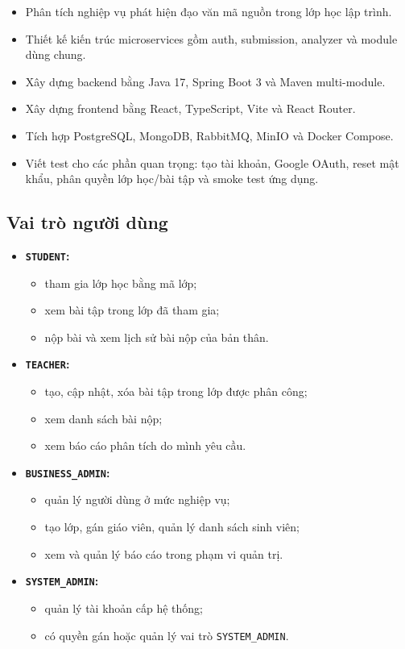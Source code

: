 \documentclass[12pt,a4paper]{article}
\begin{document}
\begin{itemize}
    \item Phân tích nghiệp vụ phát hiện đạo văn mã nguồn trong lớp học lập trình.
    \item Thiết kế kiến trúc microservices gồm auth, submission, analyzer và module dùng chung.
    \item Xây dựng backend bằng Java 17, Spring Boot 3 và Maven multi-module.
    \item Xây dựng frontend bằng React, TypeScript, Vite và React Router.
    \item Tích hợp PostgreSQL, MongoDB, RabbitMQ, MinIO và Docker Compose.
    \item Viết test cho các phần quan trọng: tạo tài khoản, Google OAuth, reset mật khẩu, phân quyền lớp học/bài tập và smoke test ứng dụng.
\end{itemize}

\subsection{Vai trò người dùng}

\begin{itemize}
    \item \textbf{\texttt{STUDENT}:}
    \begin{itemize}
        \item tham gia lớp học bằng mã lớp;
        \item xem bài tập trong lớp đã tham gia;
        \item nộp bài và xem lịch sử bài nộp của bản thân.
    \end{itemize}
    \item \textbf{\texttt{TEACHER}:}
    \begin{itemize}
        \item tạo, cập nhật, xóa bài tập trong lớp được phân công;
        \item xem danh sách bài nộp;
        \item xem báo cáo phân tích do mình yêu cầu.
    \end{itemize}
    \item \textbf{\texttt{BUSINESS\_ADMIN}:}
    \begin{itemize}
        \item quản lý người dùng ở mức nghiệp vụ;
        \item tạo lớp, gán giáo viên, quản lý danh sách sinh viên;
        \item xem và quản lý báo cáo trong phạm vi quản trị.
    \end{itemize}
    \item \textbf{\texttt{SYSTEM\_ADMIN}:}
    \begin{itemize}
        \item quản lý tài khoản cấp hệ thống;
        \item có quyền gán hoặc quản lý vai trò \texttt{SYSTEM\_ADMIN}.
    \end{itemize}
\end{itemize}
\end{document}
